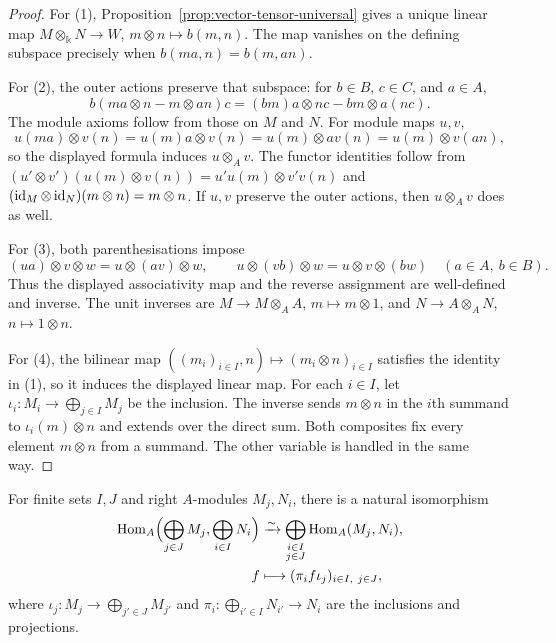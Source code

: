 \begin{supplementary}
\begin{proof}
For (1), Proposition~\ref{prop:vector-tensor-universal} gives a unique linear map $M\otimes_\Bbbk N\to W$, $m\otimes n\mapsto b(m,n)$.
The map vanishes on the defining subspace precisely when $b(ma,n)=b(m,an)$.

For (2), the outer actions preserve that subspace: for $b\in B$, $c\in C$, and $a\in A$,
\[
b(ma\otimes n-m\otimes an)c
=(bm)a\otimes nc-bm\otimes a(nc).
\]
The module axioms follow from those on $M$ and $N$.
For module maps $u,v$,
\[
u(ma)\otimes v(n)=u(m)a\otimes v(n)
=u(m)\otimes av(n)=u(m)\otimes v(an),
\]
so the displayed formula induces $u\otimes_A v$.
The functor identities follow from
$(u'\otimes v')(u(m)\otimes v(n))=u'u(m)\otimes v'v(n)$ and
$(\operatorname{id}_M\otimes\operatorname{id}_N)(m\otimes n)=m\otimes n$.
If $u,v$ preserve the outer actions, then $u\otimes_A v$ does as well.

For (3), both parenthesisations impose
\[
(ua)\otimes v\otimes w=u\otimes(av)\otimes w,\qquad
u\otimes(vb)\otimes w=u\otimes v\otimes(bw)
\quad(a\in A,\ b\in B).
\]
Thus the displayed associativity map and the reverse assignment are well-defined and inverse.
The unit inverses are $M\to M\otimes_A A$, $m\mapsto m\otimes1$, and $N\to A\otimes_A N$, $n\mapsto1\otimes n$.

For (4), the bilinear map $((m_i)_{i\in I},n)\mapsto(m_i\otimes n)_{i\in I}$ satisfies the identity in (1), so it induces the displayed linear map.
For each $i\in I$, let $\iota_i:M_i\to\bigoplus_{j\in I}M_j$ be the inclusion.
The inverse sends $m\otimes n$ in the $i$th summand to $\iota_i(m)\otimes n$ and extends over the direct sum.
Both composites fix every element $m\otimes n$ from a summand.
The other variable is handled in the same way.
\end{proof}
\end{supplementary}

\begin{lemma}\label{lem:hom-finite-sums}
For finite sets $I,J$ and right $A$-modules $M_j,N_i$, there is a natural isomorphism
\begin{equation}\label{eq:hom-finite-sums}
\begin{aligned}
\operatorname{Hom}\nolimits_A\Bigl(\bigoplus_{j\in J}M_j,\bigoplus_{i\in I}N_i\Bigr)
&\xrightarrow{\sim}\bigoplus_{\substack{i\in I\\j\in J}}\operatorname{Hom}\nolimits_A(M_j,N_i),\\
f&\longmapsto(\pi_i f\iota_j)_{i\in I,\ j\in J},
\end{aligned}
\end{equation}
where $\iota_j:M_j\to\bigoplus_{j'\in J}M_{j'}$ and $\pi_i:\bigoplus_{i'\in I}N_{i'}\to N_i$ are the inclusions and projections.
\end{lemma}

